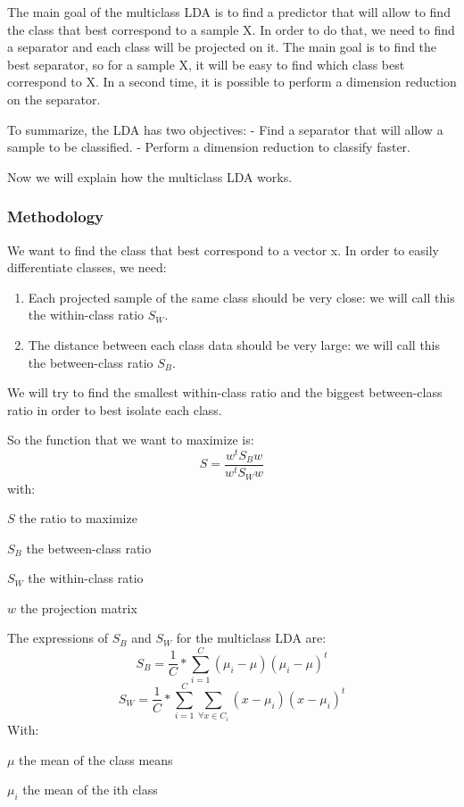 The main goal of the multiclass LDA is to find a predictor that will allow to find the class that best correspond to a sample X.
In order to do that, we need to find a separator and each class will be projected on it.
The main goal is to find the best separator, so for a sample X, it will be easy to find which class
best correspond to X.
In a second time, it is possible to perform a dimension reduction on the separator.

To summarize, the LDA has two objectives:
- Find a separator that will allow a sample to be classified.
- Perform a dimension reduction to classify faster.

Now we will explain how the multiclass LDA works. 

\subsubsection{Methodology}

We want to find the class that best correspond to a vector x.
In order to easily differentiate classes, we need:

\begin{enumerate}
\item Each projected sample of the same class should be very close: we will call this the within-class ratio $S_W$.
\item The distance between each class data should be very large: we will call this the between-class ratio $S_B$.
\end{enumerate}

We will try to find the smallest within-class ratio and the biggest between-class ratio in order to best isolate each class.

So the function that we want to maximize is:
$$S = \frac{w^t S_B w}{w^t S_W w}$$
with:
\begin{itemize*}
  \item $S$ the ratio to maximize
  \item $S_B$ the between-class ratio
  \item $S_W$ the within-class ratio
  \item $w$ the projection matrix
\end{itemize*}

The expressions of $S_B$ and $S_W$ for the multiclass LDA are:
$$S_B = \frac{1}{C} * \sum\limits_{i = 1}^C (\mu_i - \mu)(\mu_i - \mu)^t$$
$$S_W = \frac{1}{C} * \sum\limits_{i = 1}^C \sum\limits_{\forall x \in C_i} (x - \mu_i)(x - \mu_i)^t$$
With:
\begin{itemize*}
  \item $\mu$ the mean of the class means
  \item $\mu_i$ the mean of the ith class
\end{itemize*}

